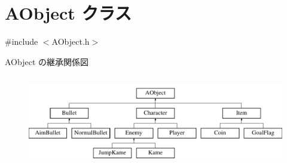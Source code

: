 \hypertarget{class_a_object}{\section{A\+Object クラス}
\label{class_a_object}
}


{\ttfamily \#include $<$A\+Object.\+h$>$}

A\+Object の継承関係図\begin{figure}[H]
\begin{center}
\leavevmode
\includegraphics[height=4.000000cm]{class_a_object}
\end{center}
\end{figure}
